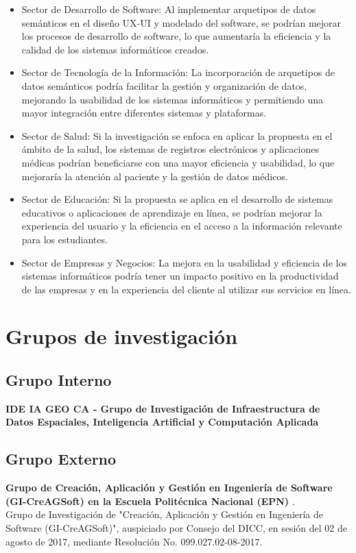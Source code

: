 \documentclass[12pt,a4paper]{article}
\begin{document}
\begin{itemize}
  \item Sector de Desarrollo de Software: Al implementar arquetipos de datos semánticos en el diseño UX-UI y modelado del software, se podrían mejorar los procesos de desarrollo de software, lo que aumentaría la eficiencia y la calidad de los sistemas informáticos creados.

  \item Sector de Tecnología de la Información: La incorporación de arquetipos de datos semánticos podría facilitar la gestión y organización de datos, mejorando la usabilidad de los sistemas informáticos y permitiendo una mayor integración entre diferentes sistemas y plataformas.
  
  \item Sector de Salud: Si la investigación se enfoca en aplicar la propuesta en el ámbito de la salud, los sistemas de registros electrónicos y aplicaciones médicas podrían beneficiarse con una mayor eficiencia y usabilidad, lo que mejoraría la atención al paciente y la gestión de datos médicos.
  
  \item Sector de Educación: Si la propuesta se aplica en el desarrollo de sistemas educativos o aplicaciones de aprendizaje en línea, se podrían mejorar la experiencia del usuario y la eficiencia en el acceso a la información relevante para los estudiantes.
  
  \item Sector de Empresas y Negocios: La mejora en la usabilidad y eficiencia de los sistemas informáticos podría tener un impacto positivo en la productividad de las empresas y en la experiencia del cliente al utilizar sus servicios en línea.
  \end{itemize}
\section{Grupos de investigación}
\subsection{Grupo Interno}
\hspace{1cm} 
\textbf{IDE IA GEO CA - Grupo de Investigación de Infraestructura de Datos Espaciales, Inteligencia Artificial y Computación Aplicada}
\subsection{Grupo Externo}
\hspace{1cm} 
\textbf{Grupo de Creación, Aplicación y Gestión en Ingeniería de Software (GI-CreAGSoft) en la Escuela Politécnica Nacional (EPN) }.\\
Grupo de Investigación de "Creación, Aplicación y Gestión en Ingeniería de Software (GI-CreAGSoft)", auspiciado por Consejo del DICC, en sesión del 02 de agosto de 2017, mediante Resolución No. 099.027.02-08-2017.
\end{document}
